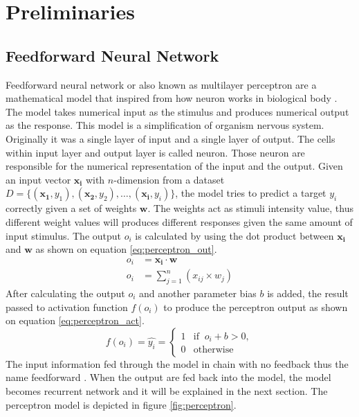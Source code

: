 \chapter{Preliminaries}
\label{chap:preliminaries}

\section{Feedforward Neural Network}
    Feedforward neural network or also known as multilayer perceptron
    are a mathematical model that inspired from how neuron works in
    biological body \citep{Goodfellow-et-al-2016}. The model takes
    numerical input as the stimulus and produces numerical output as
    the response. This model is a simplification of organism nervous
    system. Originally it was a single layer of input and a single
    layer of output. The cells within input layer and output layer is
    called neuron. Those neuron are responsible for the numerical
    representation of the input and the output. Given an input vector
    $\mathbf{x_i}$ with $n$-dimension from a dataset $D =
    \{(\mathbf{x_1}, y_1), (\mathbf{x_2}, y_2), \dots, (\mathbf{x_i},
    y_i)\}$, the model tries to predict a target $y_i$ correctly given
    a set of weights $\mathbf{w}$. The weights act as stimuli
    intensity value, thus different weight values will produces
    different responses given the same amount of input stimulus. The
    output $o_i$ is calculated by using the dot product between
    $\mathbf{x_i}$ and $\mathbf{w}$ as shown on equation
    \ref{eq:perceptron_out}. 
    \begin{align}
        \label{eq:perceptron_out}
        o_i &= \mathbf{x_i} \cdot \mathbf{w} \\
        o_i &= \sum_{j=1}^n (x_{ij} \times w_j)
    \end{align}
    After calculating the output $o_i$ and another parameter bias $b$ is
    added, the result passed to activation function $f(o_i)$ to produce
    the perceptron output as shown on equation
    \ref{eq:perceptron_act}.
    \begin{equation}
        \label{eq:perceptron_act}
        f(o_i) = \hat{y_i} =
        \begin{cases}
            1 & \text{if }\ o_i + b > 0,\\
            0 & \text{otherwise}
        \end{cases}
    \end{equation}
    The input information fed through the model in chain with no
    feedback thus the name feedforward \citep{Goodfellow-et-al-2016}.
    When the output are fed back into the model, the model becomes
    recurrent network and it will be explained in the next section.
    The perceptron model is depicted in figure \ref{fig:perceptron}.

